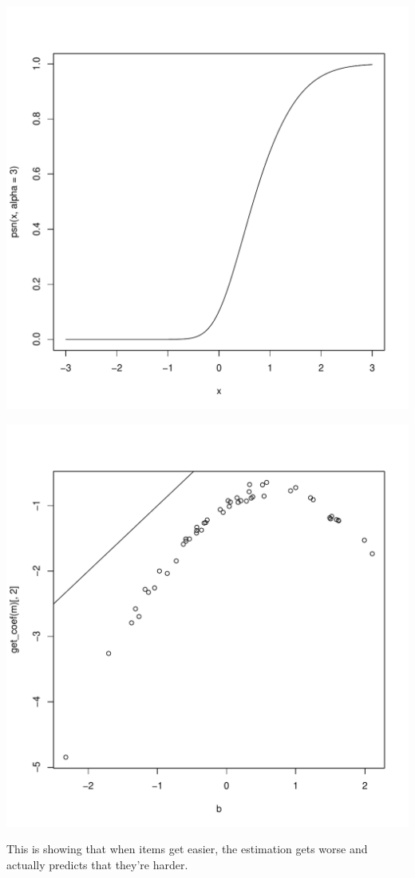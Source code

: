 \documentclass{article}\usepackage[]{graphicx}\usepackage[]{color}
\makeatletter
\def\maxwidth{ %
  \ifdim\Gin@nat@width>\linewidth
    \linewidth
  \else
    \Gin@nat@width
  \fi
}
\newenvironment{knitrout}{}{} %
\makeatother
\begin{document}
\begin{enumerate}
\begin{knitrout}
\includegraphics[width=\maxwidth]{figure/unnamed-chunk-8-2} 

\includegraphics[width=\maxwidth]{figure/unnamed-chunk-8-3} 

\end{knitrout}
This is showing that when items get easier, the estimation gets worse and actually predicts that they're harder. 

\end{enumerate}
\end{document}
